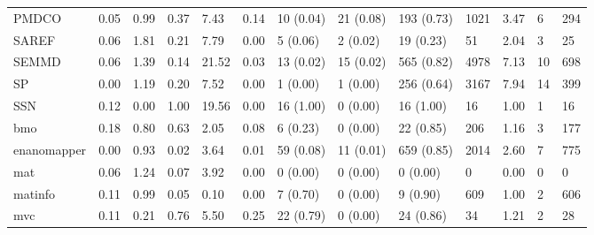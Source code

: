 \begin{table}
\begin{tabular}{m{3.5cm}m{2cm}m{2cm}m{2cm}m{2cm}m{2cm}m{2cm}m{2cm}m{2cm}m{2cm}m{2cm}m{2cm}m{2cm}}
PMDCO                   &                0.05 &                  0.99 &                   0.37 &               7.43 &               0.14 &   10 (0.04) &   21 (0.08) &   193 (0.73) &            1021 &     3.47 &          6 &               294 \\
SAREF                   &                0.06 &                  1.81 &                   0.21 &               7.79 &               0.00 &    5 (0.06) &    2 (0.02) &    19 (0.23) &              51 &     2.04 &          3 &                25 \\
SEMMD                   &                0.06 &                  1.39 &                   0.14 &              21.52 &               0.03 &   13 (0.02) &   15 (0.02) &   565 (0.82) &            4978 &     7.13 &         10 &               698 \\
SP                      &                0.00 &                  1.19 &                   0.20 &               7.52 &               0.00 &    1 (0.00) &    1 (0.00) &   256 (0.64) &            3167 &     7.94 &         14 &               399 \\
SSN                     &                0.12 &                  0.00 &                   1.00 &              19.56 &               0.00 &   16 (1.00) &    0 (0.00) &    16 (1.00) &              16 &     1.00 &          1 &                16 \\
bmo                     &                0.18 &                  0.80 &                   0.63 &               2.05 &               0.08 &    6 (0.23) &    0 (0.00) &    22 (0.85) &             206 &     1.16 &          3 &               177 \\
enanomapper             &                0.00 &                  0.93 &                   0.02 &               3.64 &               0.01 &   59 (0.08) &   11 (0.01) &   659 (0.85) &            2014 &     2.60 &          7 &               775 \\
mat                     &                0.06 &                  1.24 &                   0.07 &               3.92 &               0.00 &    0 (0.00) &    0 (0.00) &     0 (0.00) &               0 &     0.00 &          0 &                 0 \\
matinfo                 &                0.11 &                  0.99 &                   0.05 &               0.10 &               0.00 &    7 (0.70) &    0 (0.00) &     9 (0.90) &             609 &     1.00 &          2 &               606 \\
mvc                     &                0.11 &                  0.21 &                   0.76 &               5.50 &               0.25 &   22 (0.79) &    0 (0.00) &    24 (0.86) &              34 &     1.21 &          2 &                28 \\

\end{tabular}
\end{table}
